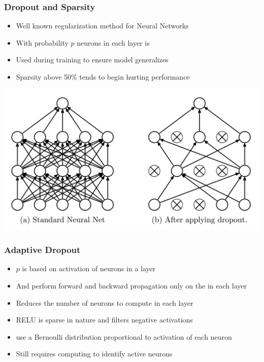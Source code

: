 \documentclass{beamer}
\begin{document}
\begin{frame}
    \frametitle{Dropout and Sparsity}
    \begin{minipage}{0.5\textwidth}
        \begin{itemize}
            \item Well known regularization method for Neural Networks
            \item With probability $p$ neurons in each layer is 
            \item Used during training to ensure model generalizes 
            \item Sparsity above 50\% tends to begin hurting performance
        \end{itemize}
    \end{minipage}\hfill
    \begin{minipage}{0.5\textwidth}
        \includegraphics[width=\textwidth]{images/dropout.png}
    \end{minipage}
    
\end{frame}

\begin{frame}
    \frametitle{Adaptive Dropout}
    \begin{itemize}
        \item $p$ is  based on activation of neurons in a layer
        \item And perform forward and backward propagation only on the  in each layer
        \item Reduces the number of neurons to compute in each layer
        \item RELU is sparse in nature and filters negative activations
        \item \cite{Lei_adaptive_dropout} use a Bernoulli distribution proportional to activation of each neuron
        \item Still requires computing  to identify active neurons
    \end{itemize}
    

\end{frame}
\end{document}
